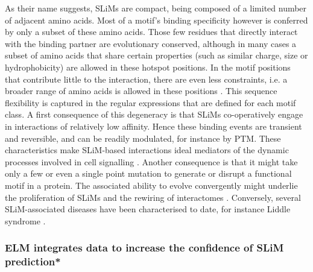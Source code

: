 As their name suggests, SLiMs are compact, being composed of a limited number of 
adjacent amino acids. Most of a motif’s binding specificity however is conferred 
by only a subset of these amino acids. Those few residues that directly interact 
with the binding partner are evolutionary conserved, although in many cases a 
subset of amino acids that share certain properties (such as similar charge, 
size or hydrophobicity) are allowed in these hotspot positions. In the motif 
positions that contribute little to the interaction, there are even less 
constraints, i.e. a broader range of amino acids is allowed in these positions 
\cite{21909575}. This sequence flexibility is captured in the regular 
expressions that are defined for each motif class. A first consequence of this 
degeneracy is that SLiMs co-operatively engage in interactions of relatively low 
affinity. Hence these binding events are transient and reversible, and can be 
readily modulated, for instance by PTM. These characteristics make SLiM-based 
interactions ideal mediators of the dynamic processes involved in cell 
signalling \cite{22480932}. Another consequence is that it might take only a few 
or even a single point mutation to generate or disrupt a functional motif in a 
protein. The associated ability to evolve convergently might underlie the 
proliferation of SLiMs and the rewiring of interactomes \cite{26589632,
22346764}. Conversely, several SLiM-associated diseases have been 
characterised to date, for instance Liddle syndrome \cite{15483078}.

\subsubsection*{ELM integrates data to increase the confidence of SLiM prediction*}

